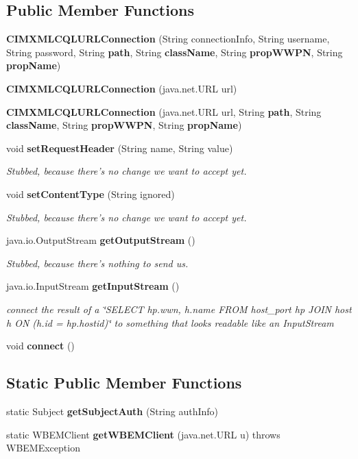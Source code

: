 \subsection*{Public Member Functions}
\begin{DoxyCompactItemize}
\item 
{\bf C\+I\+M\+X\+M\+L\+C\+Q\+L\+U\+R\+L\+Connection} (String connection\+Info, String username, String password, String {\bf path}, String {\bf class\+Name}, String {\bf prop\+W\+W\+P\+N}, String {\bf prop\+Name})
\item 
{\bf C\+I\+M\+X\+M\+L\+C\+Q\+L\+U\+R\+L\+Connection} (java.\+net.\+U\+R\+L url)
\item 
{\bf C\+I\+M\+X\+M\+L\+C\+Q\+L\+U\+R\+L\+Connection} (java.\+net.\+U\+R\+L url, String {\bf path}, String {\bf class\+Name}, String {\bf prop\+W\+W\+P\+N}, String {\bf prop\+Name})
\item 
void {\bf set\+Request\+Header} (String name, String value)
\begin{DoxyCompactList}\small\item\em Stubbed, because there's no change we want to accept yet. \end{DoxyCompactList}\item 
void {\bf set\+Content\+Type} (String ignored)
\begin{DoxyCompactList}\small\item\em Stubbed, because there's no change we want to accept yet. \end{DoxyCompactList}\item 
java.\+io.\+Output\+Stream {\bf get\+Output\+Stream} ()
\begin{DoxyCompactList}\small\item\em Stubbed, because there's nothing to send us. \end{DoxyCompactList}\item 
java.\+io.\+Input\+Stream {\bf get\+Input\+Stream} ()
\begin{DoxyCompactList}\small\item\em connect the result of a \char`\"{}\+S\+E\+L\+E\+C\+T hp.\+wwn, h.\+name F\+R\+O\+M host\+\_\+port hp J\+O\+I\+N host h O\+N (h.\+id = hp.\+hostid)\char`\"{} to something that looks readable like an Input\+Stream \end{DoxyCompactList}\item 
void {\bf connect} ()
\end{DoxyCompactItemize}
\subsection*{Static Public Member Functions}
\begin{DoxyCompactItemize}
\item 
static Subject {\bf get\+Subject\+Auth} (String auth\+Info)
\item 
static W\+B\+E\+M\+Client {\bf get\+W\+B\+E\+M\+Client} (java.\+net.\+U\+R\+L u)  throws W\+B\+E\+M\+Exception     
\end{DoxyCompactItemize}

